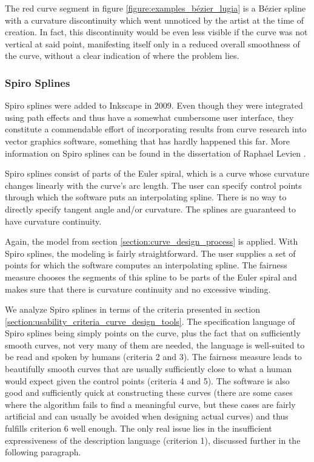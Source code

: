 \documentclass[a4paper]{article}
\begin{document}
				The red curve segment in figure \ref{figure:examples_bézier_lugia} is a Bézier spline with a curvature discontinuity which went unnoticed by the artist at the time of creation. In fact, this discontinuity would be even less visible if the curve was not vertical at said point, manifesting itself only in a reduced overall smoothness of the curve, without a clear indication of where the problem lies.

			\subsubsection{Spiro Splines}
			\label{section:spiro_splines}

				Spiro splines were added to Inkscape in 2009. Even though they were integrated using path effects and thus have a somewhat cumbersome user interface, they constitute a commendable effort of incorporating results from curve research into vector graphics software, something that has hardly happened this far. More information on Spiro splines can be found in the dissertation of Raphael Levien \cite{thesis-spiro}.

				Spiro splines consist of parts of the Euler spiral, which is a curve whose curvature changes linearly with the curve's arc length. The user can specify control points through which the software puts an interpolating spline. There is no way to directly specify tangent angle and/or curvature. The splines are guaranteed to have curvature continuity.

				Again, the model from section \ref{section:curve_design_process} is applied. With Spiro splines, the modeling is fairly straightforward. The user supplies a set of points for which the software computes an interpolating spline. The fairness measure chooses the segments of this spline to be parts of the Euler spiral and makes sure that there is curvature continuity and no excessive winding.

				We analyze Spiro splines in terms of the criteria presented in section \ref{section:usability_criteria_curve_design_tools}. The specification language of Spiro splines being simply points on the curve, plus the fact that on sufficiently smooth curves, not very many of them are needed, the language is well-suited to be read and spoken by humans (criteria 2 and 3). The fairness measure leads to beautifully smooth curves that are usually sufficiently close to what a human would expect given the control points (criteria 4 and 5). The software is also good and sufficiently quick at constructing these curves (there are some cases where the algorithm fails to find a meaningful curve, but these cases are fairly artificial and can usually be avoided when designing actual curves) and thus fulfills criterion 6 well enough. The only real issue lies in the insufficient expressiveness of the description language (criterion 1), discussed further in the following paragraph.
\end{document}
